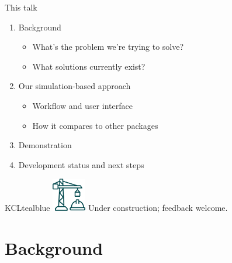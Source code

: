 \documentclass[11pt]{beamer}
\newcommand{\sgap}{\vspace{0.5em}}
\begin{document}
\begin{frame}[t]{This talk}
	\sgap
	\Large
	\begin{enumerate}
		\item Background
		      \begin{itemize}
			      \item What's the problem we're trying to solve?
			      \item What solutions currently exist?
		      \end{itemize}
		\item Our simulation-based approach
		      \begin{itemize}
			      \item Workflow and user interface
			      \item How it compares to other packages
		      \end{itemize}
		\item Demonstration
		\item Development status and next steps
	\end{enumerate}

	\normalsize
	\vspace{6mm}
	\begin{cbox}{KCLtealblue}{}
		\centering
		\includegraphics[width=4em,valign=c]{figures/construction-site.pdf}
		\hspace{2em} {\large Under construction; feedback welcome.}
	\end{cbox}

\end{frame}

\section{Background}
\end{document}

